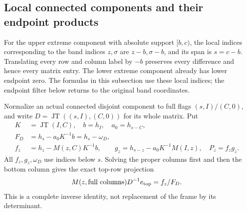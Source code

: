 \documentclass[11pt,a4paper]{amsart}
\numberwithin{equation}{section}
\theoremstyle{plain}
\theoremstyle{definition}
\newcommand{\JT}{\operatorname{JT}}
\begin{document}
\subsection{Local connected components and their endpoint products}
For the upper extreme component with absolute support \([b,c)\), the
local indices corresponding to the band indices \(z,\sigma\) are
\(z-b,\sigma-b\), and its span is \(s=c-b\).  Translating every row
and column label by \(-b\) preserves every difference and hence every
matrix entry.  The lower extreme component already has lower endpoint
zero.  The formulas in this subsection use these local indices; the
endpoint filter below returns to the original band coordinates.

Normalize an actual connected disjoint component to full flags
\((s,I)/(C,0)\), and write \(D=\JT((s,I),(C,0))\) for its whole matrix.
Put
\begin{equation}\label{eq:local-pole-data}
\begin{split}
 K&=\JT(I,C),\quad b=h_I,\quad a_0=h_{s-C},\\
 F_D&=h_s-a_0K^{-1}b=h_s-\omega_D,\\
 f_z&=h_z-M(z,C)K^{-1}b,\qquad
 g_z=h_{s-z}-a_0K^{-1}M(I,z),\quad P_z=f_zg_z.
\end{split}
\end{equation}
All \(f_z,g_z,\omega_D\) use indices below \(s\).  Solving the proper columns first and then the bottom column gives the exact top-row projection
\[
 M(z,\text{full columns})D^{-1}e_{\rm top}=f_z/F_D.
\]
This is a complete inverse identity, not replacement of the frame by its determinant.
\end{document}
